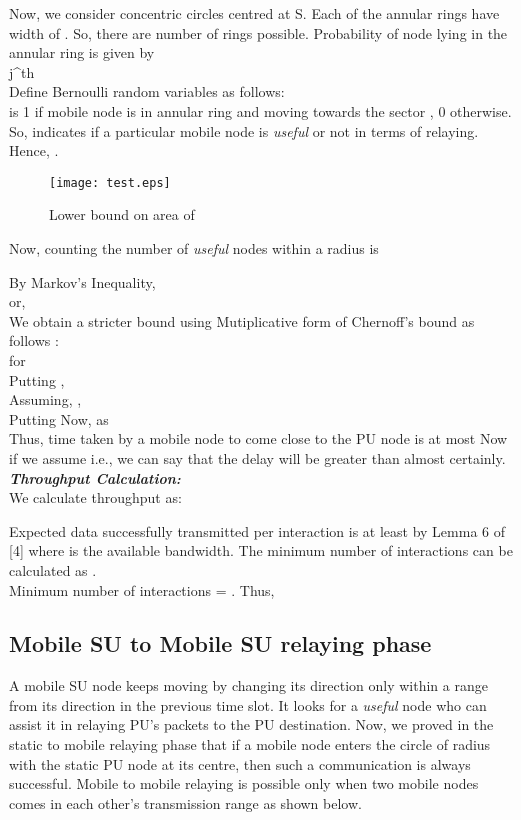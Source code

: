 \documentclass[conference]{IEEEtran}
\begin{document}
Now, we consider concentric circles  centred at S. Each of the annular rings have width of . So, there are  number of rings possible.
Probability of node  lying in the  annular ring is given by\\j^{th}\\
Define  Bernoulli random variables  as follows:\\
 is 1 if  mobile node is in  annular ring and moving towards the sector , 0 otherwise.
So,  indicates if a particular mobile node is \textit{useful} or not in terms of relaying.\\
Hence, .
\begin{figure}[H] \centering \label{con} \texttt{[image: test.eps]}
\caption{Lower bound on area of }
\end{figure}
Now, counting the number of \textit{useful} nodes within a radius  is

By Markov's Inequality, \\
or, \\
We obtain a stricter bound using Mutiplicative form of Chernoff's bound as follows :\\
 \quad for \\
Putting , \\
Assuming, , \\
Putting  Now, as \\
Thus, time taken by a mobile node to come close to the PU node is at most  Now 
if we assume  i.e., we can say that the delay will be greater than  almost certainly.\\
\emph{\bf Throughput Calculation:}\\
We calculate throughput as:
\vspace{-2mm}

Expected data successfully transmitted per interaction is at least  by Lemma 6 of [4] where  is the available bandwidth. The minimum 
number of interactions can be calculated as .
\\Minimum number of interactions =  . Thus,




\subsection{Mobile SU to Mobile SU relaying phase}
A mobile SU node keeps moving by changing its direction only within a range   from its direction in the previous time slot. It looks for a \textit{useful} node who can assist it in relaying PU's packets to the PU destination. Now, we proved in the static to mobile relaying phase that if a mobile node enters the circle of radius  with the static PU node at its centre, then such a communication is always successful. Mobile to mobile relaying is possible only when two mobile nodes comes in each other's transmission range as shown below.
\end{document}

